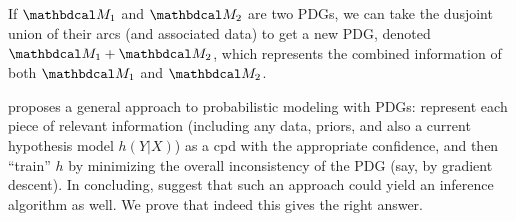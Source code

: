 \documentclass[twoside]{article}
\begin{document}



\subsection{}

If $\dg M_1$ and $\dg M_2$ are two PDGs, we can take the dusjoint union of their arcs (and associated data) to get a new PDG, denoted $\dg M_1 + \dg M_2$,
which represents the combined information of both $\dg M_1$ and $\dg M_2$.

\textcite{one-true-loss} proposes a general
approach to probabilistic modeling with PDGs: represent each piece of relevant information (including any data, priors, and also a current hypothesis model $h(Y|X)$) as a cpd with the appropriate confidence, and then ``train'' $h$ by minimizing the overall inconsistency of the PDG (say, by gradient descent).
In concluding,
\textcite{pdg-aaai} suggest that such an approach
could yield an inference algorithm as well.
We prove that indeed this gives the right answer.
\end{document}
